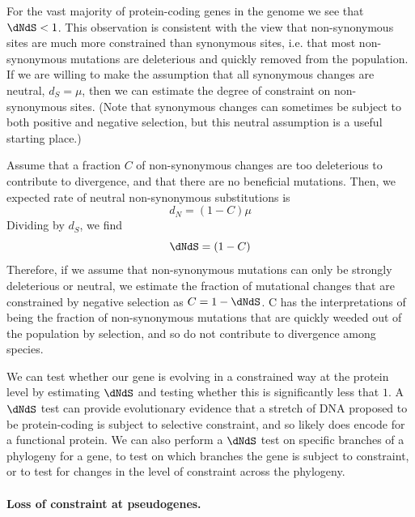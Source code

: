 For the vast majority of protein-coding genes in the genome we see that $\dNdS < 1$. This observation is consistent with the view
that non-synonymous sites are much more constrained than synonymous sites, i.e. that most non-synonymous mutations are deleterious and quickly removed from the population. If we are willing to make the assumption that all synonymous changes are
neutral, $d_S= \mu$, then we can estimate the degree of constraint on non-synonymous sites. (Note that synonymous changes can sometimes be subject to
both positive and negative selection, but this neutral assumption is a useful starting place.)

Assume that a fraction $C$ of non-synonymous changes are too
deleterious to contribute to divergence, and that there are no
beneficial mutations. Then, %
we expected rate of neutral non-synonymous substitutions is
\begin{equation}
d_N = (1-C) \mu
\end{equation}
Dividing by $d_S$, we find
\begin{equation}
\dNdS = (1-C)
\end{equation}
Therefore, if we assume that non-synonymous mutations can only be
strongly deleterious or neutral, we estimate the fraction of mutational changes that
are constrained by negative selection as $C= 1- \dNdS$. C has the
interpretations of being the fraction of non-synonymous mutations that are quickly weeded out of the population by selection, and so do not contribute to divergence among species.

We can test whether our gene is evolving in a constrained way at the protein level by estimating $\dNdS$ and testing whether this is significantly less that  $1$. A $\dNdS$ test can provide evolutionary evidence that a stretch of DNA proposed to be protein-coding is subject to selective constraint, and so likely does encode for a functional protein. We can also perform a $\dNdS$ test on specific branches of a phylogeny for a gene, to test on which branches the gene is subject to constraint, or to test for changes in the level of constraint across the phylogeny.


\paragraph{Loss of constraint at pseudogenes.}



